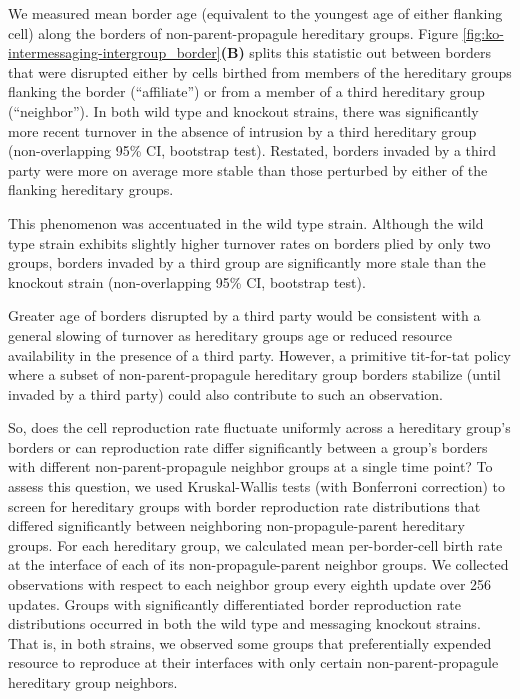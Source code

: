 We measured mean border age (equivalent to the youngest age of either flanking cell) along the borders of non-parent-propagule hereditary groups.
Figure \ref{fig:ko-intermessaging-intergroup_border}\textbf{(B)} splits this statistic out between borders that were disrupted either by cells birthed from members of the hereditary groups flanking the border (``affiliate'') or from a member of a third hereditary group (``neighbor'').
In both wild type and knockout strains, there was significantly more recent turnover in the absence of intrusion by a third hereditary group (non-overlapping 95\% CI, bootstrap test).
Restated, borders invaded by a third party were more on average more stable than those perturbed by either of the flanking hereditary groups.

This phenomenon was accentuated in the wild type strain.
Although the wild type strain exhibits slightly higher turnover rates on borders plied by only two groups, borders invaded by a third group are significantly more stale than the knockout strain (non-overlapping 95\% CI, bootstrap test).

Greater age of borders disrupted by a third party would be consistent with a general slowing of turnover as hereditary groups age or reduced resource availability in the presence of a third party.
However, a primitive tit-for-tat policy where a subset of non-parent-propagule hereditary group borders stabilize (until invaded by a third party) could also contribute to such an observation.

So, does the cell reproduction rate fluctuate uniformly across a hereditary group's borders or can reproduction rate differ significantly between a group's borders with different non-parent-propagule neighbor groups at a single time point?
To assess this question, we used Kruskal-Wallis tests (with Bonferroni correction) to screen for hereditary groups with border reproduction rate distributions that differed significantly between neighboring non-propagule-parent hereditary groups.
For each hereditary group, we calculated mean per-border-cell birth rate at the interface of each of its non-propagule-parent neighbor groups.
We collected observations with respect to each neighbor group every eighth update over 256 updates.
Groups with significantly differentiated border reproduction rate distributions occurred in both the wild type and messaging knockout strains.
That is, in both strains, we observed some groups that preferentially expended resource to reproduce at their interfaces with only certain non-parent-propagule hereditary group neighbors.

